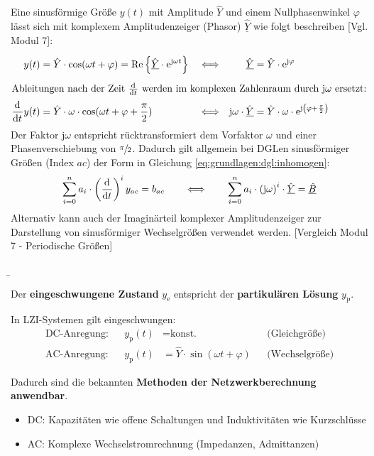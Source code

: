 \begin{frame}
{    Eine sinusförmige Größe $y(t)$ mit Amplitude $\hat{Y}$ und einem Nullphasenwinkel $\varphi$ lässt sich mit komplexem Amplitudenzeiger (Phasor) $\underline{\hat{Y}}$ 
    wie folgt beschreiben [Vgl. Modul 7]:
    \begin{align*}
        y(t) &= \hat{Y} \cdot \cos(\omega t + \varphi) = \operatorname{Re}\left\{ \underline{\hat{Y}} \cdot \mathrm{e}^{\mathrm{j} \omega t} \right\} &
            &\Longleftrightarrow& 
            \underline{\hat{Y}} &= \hat{Y} \cdot \mathrm{e}^{\mathrm{j} \varphi} 
            \vphantom{\bigg|}\\
    \intertext{Ableitungen nach der Zeit $\frac{\mathrm{d}^{{}}}{\mathrm{d}t^{{}}}$ werden im komplexen Zahlenraum durch $\mathrm{j} \omega$ ersetzt:}
        \frac{\mathrm{d}^{{}}}{\mathrm{d}t^{{}}} y(t) &= \hat{Y} \cdot \omega \cdot \cos(\omega t + \varphi + \frac{\pi}{2}) &
            &\Longleftrightarrow& 
            \mathrm{j} \omega \cdot  \underline{\hat{Y}} &= \hat{Y} \cdot \omega \cdot \mathrm{e}^{\mathrm{j} \left(\varphi + \frac{\pi}{2}\right)}
    \end{align*}
    Der Faktor $\mathrm{j}\omega$ entspricht rücktransformiert dem Vorfaktor $\omega$ und einer Phasenverschiebung von $\sfrac{\pi}{2}$. 
    Dadurch gilt allgemein bei DGLen sinusförmiger Größen (Index $ac$) der Form in Gleichung \ref{eq:grundlagen:dgl:inhomogen}: 
    \begin{equation}
        \sum_{i=0}^n a_i \cdot \left(\frac{\mathrm{d}^{{}}}{\mathrm{d}t^{{}}}\right)^i y_{ac} = b_{ac}
        \qquad \Longleftrightarrow \qquad 
        \sum_{i=0}^n a_i \cdot \left(\mathrm{j}\omega\right)^i \cdot \underline{\hat{Y}} = \underline{\hat{B}}
        \label{eq:grundlagen:dgl:komplex}
    \end{equation}
    Alternativ kann auch der Imaginärteil komplexer Amplitudenzeiger zur Darstellung von sinusförmiger Wechselgrößen verwendet werden. 
    [Vergleich Modul 7 - Periodische Größen]

}%
\b{%
    Der \textbf{eingeschwungene Zustand} $y_{\mathrm{e}}$ entspricht der \textbf{partikulären Lösung} $y_{\mathrm{p}}$.
    \vspace{2mm}

    In LZI-Systemen gilt eingeschwungen:
    \begin{align}
        \text{DC-Anregung:} && y_{\mathrm{p}}(t) &= \text{konst.} &&\text{(Gleichgröße)}\\
        \text{AC-Anregung:} && y_{\mathrm{p}}(t) &= \hat{Y} \cdot \sin(\omega t + \varphi) &&\text{(Wechselgröße)}
    \end{align}

    Dadurch sind die bekannten \textbf{Methoden der Netzwerkberechnung anwendbar}.
    \vspace{2mm}

    \begin{itemize}
        \item[] DC: Kapazitäten wie offene Schaltungen und Induktivitäten wie Kurzschlüsse
        \item[] AC: Komplexe Wechselstromrechnung (Impedanzen, Admittanzen)
    \end{itemize}
}
\end{frame}
